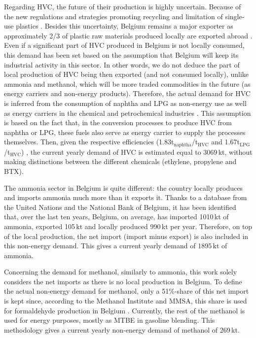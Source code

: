 Regarding \gls{HVC}, the future of their production is highly uncertain. Because of the new regulations and strategies promoting recycling and limitation of single-use plastics \cite{EU_plastics}.  Besides this uncertainty, Belgium remains a major exporter as approximately 2/3 of plastic raw materials produced locally are exported abroad \cite{agoria_plastics}. Even if a significant part of \gls{HVC} produced in Belgium is not locally consumed, this demand has been set based on the assumption that Belgium will keep its industrial activity in this sector. In other words, we do not deduce the part of local production of \gls{HVC} being then exported (and not consumed locally), unlike ammonia and methanol, which will be more traded commodities in the future (as energy carriers and non-energy products). Therefore, the actual demand for \gls{HVC} is inferred from the consumption of naphtha and \gls{LPG} as non-energy use as well as energy carriers in the chemical and petrochemical industries \cite{statbel_NED_2019}. This assumption is based on the fact that, in the conversion processes to produce \gls{HVC} from naphtha or \gls{LPG}, these fuels also serve as energy carrier to supply the processes themselves. Then, given the respective efficiencies (1.83t$_{\text{naphtha}}$/t$_{\text{HVC}}$ and 1.67t$_{\text{LPG}}$/t$_{\text{HVC}}$) \cite{IEA2018_petrochemicals}, the current yearly demand of \gls{HVC} is estimated equal to 3069\,kt, without making distinctions between the different chemicals (\ie ethylene, propylene and \gls{BTX}). 

The ammonia sector in Belgium is quite different: the country locally produces and imports ammonia much more than it exports it. Thanks to a database from the United Nations \cite{UN_statistics} and the National Bank of Belgium, it has been identified that, over the last ten years, Belgium, on average, has imported 1010\,kt of ammonia, exported 105\,kt and locally produced 990\,kt per year. Therefore, on top of the local production, the net import (\ie import minus export) is also included in this non-energy demand. This gives a current yearly demand of 1895\,kt of ammonia.

Concerning the demand for methanol, similarly to ammonia, this work solely considers the net imports as there is no local production in Belgium. To define the actual non-energy demand for methanol, only a 51\%-share of this net import is kept since, according to the Methanol Institute and \gls{MMSA}, this share is used for formaldehyde production in Belgium \cite{MMSA51}. Currently, the rest of the methanol is used for energy purposes, mostly as \gls{MTBE} in gasoline blending. This methodology gives a current yearly non-energy demand of methanol of 269\,kt.

